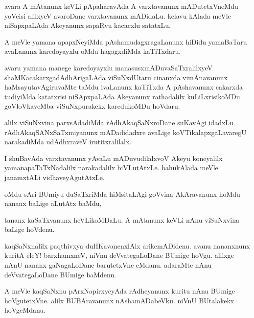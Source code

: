 \begin{mng}
avara A mAtanunx keVLi pApaharavAda A varxtavanunx mADutetxVneMdu yoVcisi alilxyeV avaroDane varxtavanunx mADidaLu. kelavu kAlada meVle niSapxpaLAda Akeyanunx sapaRvu kacacxlu satatxLu.
\end{mng}

\begin{mng}
A meVle yamana apapxNeyiMda pAshamudagxragaLanunx hiDidu yamaBaTaru avaLanunx karedoyayxlu oMdu hagagxdiMda kaTiTxdaru.
\end{mng}

\begin{mng}
avaru yamana manege karedoyayxlu manasusxmADuvaSaTxralilxyeV shaMKacakarxgadAdhArigaLAda viSuNxdUtaru cinanxda vimAnavanunx haMsayutavAgiruvaMte taMdu ivaLanunx kaTiTxda A pAshavanunx cakarxda tudiyiMda katatxrisi niSApxpaLAda Akeyanunx rathadalilx kuLiLxrisikoMDu goVloVkaveMba viSuNxpurakekx karedukoMDu hoVdaru.
\end{mng}

\begin{mng}
alilx viSuNxvina parxsAdadiMda rAdhAkaqSaNxroDane suKavAgi idadxLu. rAdhAkaqSANxSaTxmiyanunx mADadidadxre avaLige koVTikalapxgaLavaregU narakadiMda udAdhxraveV irutitxralilalx.
\end{mng}

\begin{mng}
I shuBavAda varxtavanunx yAvaLu mADuvudilalxvoV Akeyu koneyalilx yamanapaTaTxNadalilx narakadalilx biVLutAtxLe. bahukAlada meVle janamxtALi vidhaveyAgutAtxLe.
\end{mng}

\begin{mng}
oMdu sAri BUmiyu duSaTxriMda hiMsitaLAgi goVvina AkAravanunx hoMdu nananx baLige aLutAtx baMdu, 
\end{mng}

\begin{mng}
tananx kaSaTxvanunx heVLikoMDaLu. A mAtanunx keVLi nAnu viSuNxvina baLige hoVdenu.
\end{mng}

\begin{mng}
kaqSaNxnalilx paqthivxya duHKavanenxlAlx arikemADidenu. avanu nananxnunx kuritA eleY! barxhamxneV, niVnu deVvategaLoDane BUmige hoVgu. alilxge nAnU nananx gaNagaLoDane barutetxVne eMdanu. adaraMte nAnu deVvategaLoDane BUmige baMdenu.
\end{mng}

\begin{mng}
A meVle kaqSaNxnu pArxNapirxyeyAda rAdheyanunx kuritu nAnu BUmige hoVgutetxVne. alilx BUBAravanunx nAshamADabeVku. niVnU BUtalakekx hoVgeMdanu.
\end{mng}

